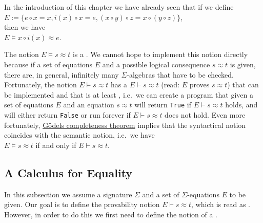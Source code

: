 \example
In the introduction of this chapter we have already seen that if we define
\\[0.2cm]
\hspace*{1.3cm}
$E := \bigl\{ e \circ x = x, i(x) \circ x = e, (x \circ y) \circ z = x \circ (y \circ z) \bigr\}$,
\\[0.2cm]
then we have
\\[0.2cm]
\hspace*{1.3cm}
$E \models x \circ i(x) \approx e$.  \eox

The notion $E \models s \approx t$ is a .  We cannot hope to implement this notion directly
because if a set of equations $E$ and a possible logical consequence $s \approx t$ is given, there are, in
general, infinitely many $\Sigma$-algebras that have to be checked.  Fortunately, the notion 
$E \models s \approx t$ has a  $E \vdash s \approx t$ (read: $E$ proves $s \approx t$)
that can be implemented and that is at least , i.e.~we can create a program that given 
a set of equations $E$ and an equation $s \approx t$ will return \texttt{True} if $E \vdash s \approx t$ holds, and will
either return \texttt{False} or run forever if $E \vdash s \approx t$ does not hold.  Even more fortunately,
\href{https://en.wikipedia.org/wiki/G%C3%B6del%27s_completeness_theorem}{G\"{o}dels completeness theorem} 
implies that the syntactical notion coincides with the semantic notion, i.e.~we have
\\[0.2cm]
\hspace*{1.3cm}
$E \models s \approx t$ \quad if and only if \quad $E \vdash s \approx t$.

\subsection{A Calculus for Equality}
In this subsection we assume a signature $\Sigma$ and a set of $\Sigma$-equations $E$ to be given.  
Our goal is to define the provability notion $E \vdash s \approx t$, which is read as .
However, in order to do this we first need to define 
the notion of a .

